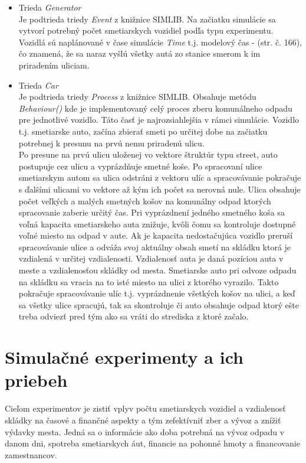 \documentclass[11pt,a4paper]{article}
\begin{document}
    \begin{itemize}
        \item Trieda \textit{Generator}\\[0.1em]
              Je podtrieda triedy \textit{Event} z knižnice SIMLIB. Na začiatku simulácie sa vytvorí potrebný počet smetiarskych vozidiel podľa typu experimentu. Vozidlá sú naplánované v čase simulácie \textit{Time} t.j. modelový čas - \cite{IMS}(str. č. 166), čo znamená, že sa naraz vyšlú všetky autá zo stanice smerom k im priradením uliciam. {\color{red}{DOBA stredisko-1. ulica!}}
        \item Trieda \textit{Car}\\[0.1em]
              Je podtrieda triedy \textit{Process} z knižnice SIMLIB. Obsahuje metódu \textit{Behaviour()} kde je implementovaný celý proces zberu komunálneho odpadu pre jednotlivé vozidlo. Táto časť je najrozsiahlejšia v rámci simulácie. Vozidlo t.j. smetiarske auto, začína zbierať smeti po určitej dobe na začiatku potrebnej k presunu na prvú nemu priradenú ulicu.\\[0.3em]
              Po presune na prvú ulicu uloženej vo vektore štruktúr typu street, auto postupuje cez ulicu a vyprázdňuje smetné koše. Po spracovaní ulice smetiarskym autom sa ulica odstráni z vektoru ulíc a spracovávanie pokračuje s ďalšími ulicami vo vektore až kým ich počet sa nerovná nule. Ulica obsahuje počet veľkých a malých smetných košov na komunálny odpad ktorých spracovanie zaberie určitý čas. Pri vyprázdnení jedného smetného koša sa voľná kapacita smetiarskeho auta znižuje, kvôli čomu sa kontroluje dostupné voľné miesto na odpad v aute. Ak je kapacita nedostačujúca vozidlo preruší spracovávanie ulice a odváža svoj aktuálny obsah smetí na skládku ktorá je vzdialená v určitej vzdialenosti. Vzdialenosť auta je daná pozíciou auta v meste a vzdialenosťou skládky od mesta. Smetiarske auto pri odvoze odpadu na skládku sa vracia na to isté miesto na ulici z ktorého vyrazilo. Takto pokračuje spracovávanie ulíc t.j. vyprázdnenie všetkých košov na ulici, a keď sa všetky ulice spracujú, tak sa skontroluje či auto obsahuje odpad ktorý ešte treba odviezť pred tým ako sa vráti do strediska z ktoré začalo.
    \end{itemize}

\section{Simulačné experimenty a ich priebeh}

    \indent Cieľom experimentov je zistiť vplyv počtu smetiarskych vozidiel a vzdialenosť skládky na časové a finančné aspekty a tým zefektívniť zber a vývoz a znížiť výdavky mesta. Jedná sa o informácie ako doba potrebná na vývoz odpadu v danom dni, spotreba smetiarskych áut, financie na pohonné hmoty a financovanie zamestnancov.
    
\end{document}
